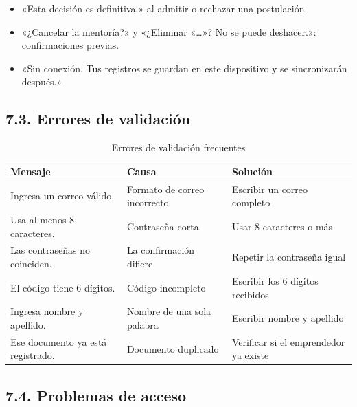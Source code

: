 \documentclass[12pt,letterpaper]{article}
\begin{document}
\begin{itemize}
\item «Esta decisión es definitiva.» al admitir o rechazar una postulación.
\item «¿Cancelar la mentoría?» y «¿Eliminar «\ldots{}»? No se puede deshacer.»: confirmaciones previas.
\item «Sin conexión. Tus registros se guardan en este dispositivo y se sincronizarán después.»
\end{itemize}

\subsection*{7.3. Errores de validación}


\begin{table}[H]\singlespacing\small
\caption{Errores de validación frecuentes}
\begin{tabularx}{\textwidth}{XXX}
\toprule
\textbf{Mensaje} & \textbf{Causa} & \textbf{Solución} \\
\midrule
\relax Ingresa un correo válido. & Formato de correo incorrecto & Escribir un correo completo \\
\relax Usa al menos 8 caracteres. & Contraseña corta & Usar 8 caracteres o más \\
\relax Las contraseñas no coinciden. & La confirmación difiere & Repetir la contraseña igual \\
\relax El código tiene 6 dígitos. & Código incompleto & Escribir los 6 dígitos recibidos \\
\relax Ingresa nombre y apellido. & Nombre de una sola palabra & Escribir nombre y apellido \\
\relax Ese documento ya está registrado. & Documento duplicado & Verificar si el emprendedor ya existe \\
\bottomrule
\end{tabularx}
\end{table}

\subsection*{7.4. Problemas de acceso}

\end{document}
